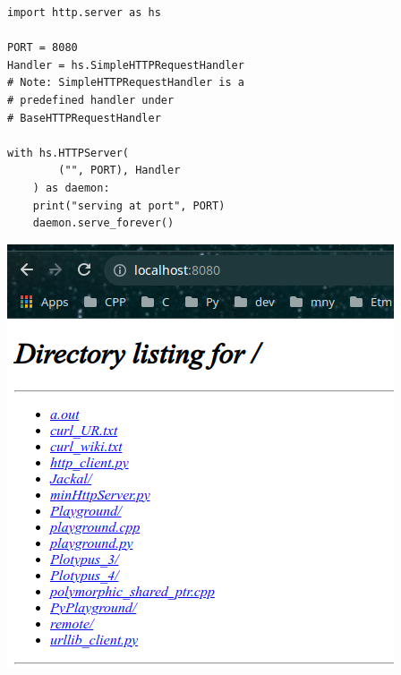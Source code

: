 \begin{frame}[fragile]
%
\begin{tcbraster}[raster columns=2,
                  raster equal height,
                  nobeforeafter,
                  raster column skip=0.1cm]
\begin{codebox}
\begin{verbatim}
import http.server as hs

PORT = 8080
Handler = hs.SimpleHTTPRequestHandler
# Note: SimpleHTTPRequestHandler is a
# predefined handler under
# BaseHTTPRequestHandler

with hs.HTTPServer(
        ("", PORT), Handler
    ) as daemon:
    print("serving at port", PORT)
    daemon.serve_forever()
\end{verbatim}
\end{codebox}
%
\begin{defbox}[Result]
\includegraphics[width=\linewidth]{./gfx/21-SimpleHttpHandler}
\end{defbox}
\end{tcbraster}
%
\end{frame}


